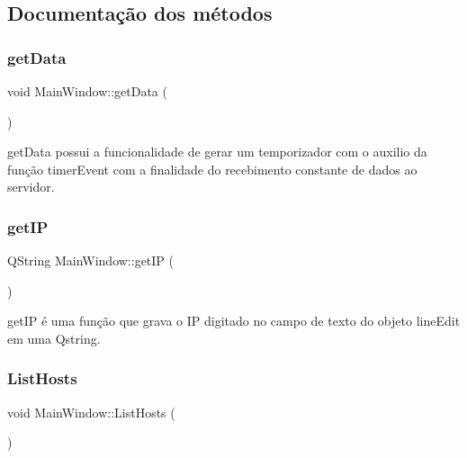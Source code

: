 \subsection{Documentação dos métodos}
\mbox{\label{class_main_window_a4a2ddf4cf2ec8e240cc340416b1df792}} 
\subsubsection{\texorpdfstring{get\+Data}{getData}}
{\footnotesize\ttfamily void Main\+Window\+::get\+Data (\begin{DoxyParamCaption}{ }\end{DoxyParamCaption})\hspace{0.3cm}{\ttfamily [slot]}}



get\+Data possui a funcionalidade de gerar um temporizador com o auxilio da função timer\+Event com a finalidade do recebimento constante de dados ao servidor. 

\mbox{\label{class_main_window_a2bf0fb2c40fb08b96f95f65d9ee1c979}} 
\subsubsection{\texorpdfstring{get\+IP}{getIP}}
{\footnotesize\ttfamily Q\+String Main\+Window\+::get\+IP (\begin{DoxyParamCaption}{ }\end{DoxyParamCaption})\hspace{0.3cm}{\ttfamily [slot]}}



get\+IP é uma função que grava o IP digitado no campo de texto do objeto line\+Edit em uma Qstring. 

\mbox{\label{class_main_window_aa1b929ac26c3c547b2904e88b7f70284}} 
\subsubsection{\texorpdfstring{List\+Hosts}{ListHosts}}
{\footnotesize\ttfamily void Main\+Window\+::\+List\+Hosts (\begin{DoxyParamCaption}{ }\end{DoxyParamCaption})\hspace{0.3cm}{\ttfamily [slot]}}



